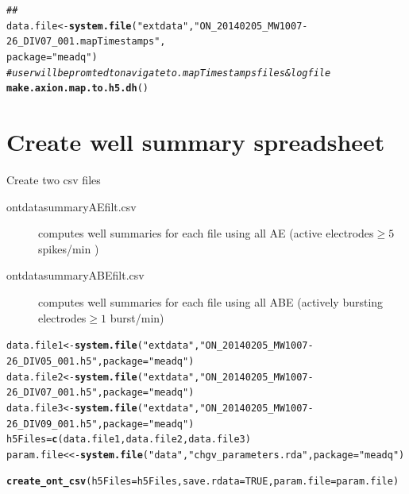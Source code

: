 \documentclass{article}\usepackage[]{graphicx}\usepackage[]{color}
\makeatletter
\newcommand{\hlnum}[1]{\textcolor[rgb]{0.686,0.059,0.569}{#1}}%
\newcommand{\hlstr}[1]{\textcolor[rgb]{0.192,0.494,0.8}{#1}}%
\newcommand{\hlcom}[1]{\textcolor[rgb]{0.678,0.584,0.686}{\textit{#1}}}%
\newcommand{\hlstd}[1]{\textcolor[rgb]{0.345,0.345,0.345}{#1}}%
\newcommand{\hlkwb}[1]{\textcolor[rgb]{0.69,0.353,0.396}{#1}}%
\newcommand{\hlkwc}[1]{\textcolor[rgb]{0.333,0.667,0.333}{#1}}%
\newcommand{\hlkwd}[1]{\textcolor[rgb]{0.737,0.353,0.396}{\textbf{#1}}}%
\newenvironment{kframe}{%
 \def\at@end@of@kframe{}%
 \ifinner\ifhmode%
  \def\at@end@of@kframe{\end{minipage}}%
  \begin{minipage}{\columnwidth}%
 \fi\fi%
 \def\FrameCommand##1{\hskip\@totalleftmargin \hskip-\fboxsep
 \colorbox{shadecolor}{##1}\hskip-\fboxsep
     \hskip-\linewidth \hskip-\@totalleftmargin \hskip\columnwidth}%
 \MakeFramed {\advance\hsize-\width
   \@totalleftmargin\z@ \linewidth\hsize
   \@setminipage}}%
 {\par\unskip\endMakeFramed%
 \at@end@of@kframe}
\newenvironment{knitrout}{}{} %
\makeatother
\begin{document}
\begin{knitrout}
\color{fgcolor}\begin{kframe}
\begin{alltt}
\hlcom{## }
\hlstd{data.file} \hlkwb{<-} \hlkwd{system.file}\hlstd{(}\hlstr{"extdata"}\hlstd{,} \hlstr{"ON_20140205_MW1007-26_DIV07_001.mapTimestamps"}\hlstd{,}
    \hlkwc{package} \hlstd{=} \hlstr{"meadq"}\hlstd{)}
\hlcom{# user will be promted to navigate to .mapTimestamps files & log file}
\hlkwd{make.axion.map.to.h5.dh}\hlstd{()}
\end{alltt}
\end{kframe}
\end{knitrout}









\section*{Create well summary spreadsheet}
Create two csv files \colon

\begin{description}
\item[ ont\textunderscore data\textunderscore summary\textunderscore AEfilt.csv] computes well summaries for each file using all AE (active electrodes\colon  $\geq 5$ spikes/min ) 
\item[ ont\textunderscore data\textunderscore summary\textunderscore ABEfilt.csv] computes well summaries for each file using all ABE (actively bursting electrodes\colon  $\geq 1$ burst/min)
\end{description}

\begin{knitrout}
\color{fgcolor}\begin{kframe}
\begin{alltt}
\hlstd{data.file1} \hlkwb{<-} \hlkwd{system.file}\hlstd{(}\hlstr{"extdata"}\hlstd{,} \hlstr{"ON_20140205_MW1007-26_DIV05_001.h5"}\hlstd{,} \hlkwc{package} \hlstd{=} \hlstr{"meadq"}\hlstd{)}
\hlstd{data.file2} \hlkwb{<-} \hlkwd{system.file}\hlstd{(}\hlstr{"extdata"}\hlstd{,} \hlstr{"ON_20140205_MW1007-26_DIV07_001.h5"}\hlstd{,} \hlkwc{package} \hlstd{=} \hlstr{"meadq"}\hlstd{)}
\hlstd{data.file3} \hlkwb{<-} \hlkwd{system.file}\hlstd{(}\hlstr{"extdata"}\hlstd{,} \hlstr{"ON_20140205_MW1007-26_DIV09_001.h5"}\hlstd{,} \hlkwc{package} \hlstd{=} \hlstr{"meadq"}\hlstd{)}
\hlstd{h5Files} \hlkwb{=} \hlkwd{c}\hlstd{(data.file1, data.file2, data.file3)}
\hlstd{param.file} \hlkwb{<<-} \hlkwd{system.file}\hlstd{(}\hlstr{"data"}\hlstd{,} \hlstr{"chgv_parameters.rda"}\hlstd{,} \hlkwc{package} \hlstd{=} \hlstr{"meadq"}\hlstd{)}

\hlkwd{create_ont_csv}\hlstd{(}\hlkwc{h5Files} \hlstd{= h5Files,} \hlkwc{save.rdata} \hlstd{=} \hlnum{TRUE}\hlstd{,} \hlkwc{param.file} \hlstd{= param.file)}
\end{alltt}
\end{kframe}
\end{knitrout}
\end{document}
